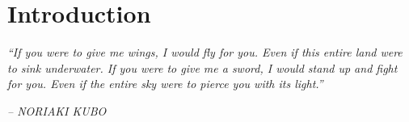 \chapter{Introduction} \label{cap:introduction}

\begin{displayquote}
    \begin{center}
        \textit{``If you were to give me wings, I would fly for you. Even if this entire land were to sink underwater. If you were to give me a sword, I would stand up and fight for you. Even if the entire sky were to pierce you with its light.''}
    \end{center}
\end{displayquote}

\begin{flushright}
   \textit{-- NORIAKI KUBO}
\end{flushright}